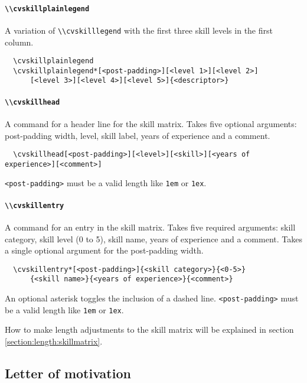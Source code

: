 \documentclass[a4paper, 11pt]{article}
\newcommand{\code}[1]{\lstinline!#1!}
\begin{document}
\paragraph{\code{\\cvskillplainlegend}}
A variation of \code{\\cvskilllegend} with the first three skill levels in the first column.
\begin{lstlisting}
  \cvskillplainlegend
  \cvskillplainlegend*[<post-padding>][<level 1>][<level 2>]
      [<level 3>][<level 4>][<level 5>]{<descriptor>}
\end{lstlisting}

\paragraph{\code{\\cvskillhead}}
A command for a header line for the skill matrix.
Takes five optional arguments: post-padding width, level, skill label, years of experience and a comment.
\begin{lstlisting}
  \cvskillhead[<post-padding>][<level>][<skill>][<years of experience>][<comment>]
\end{lstlisting}
\code{<post-padding>} must be a valid length like \code{1em} or \code{1ex}.

\paragraph{\code{\\cvskillentry}}
A command for an entry in the skill matrix.
Takes five required arguments: skill category, skill level (0 to 5), skill name, years of experience and a comment.
Takes a single optional argument for the post-padding width.
\begin{lstlisting}
  \cvskillentry*[<post-padding>]{<skill category>}{<0-5>}
      {<skill name>}{<years of experience>}{<comment>}
\end{lstlisting}
An optional asterisk toggles the inclusion of a dashed line.
\code{<post-padding>} must be a valid length like \code{1em} or \code{1ex}.

How to make length adjustments to the skill matrix will be explained in section \ref{section:length:skillmatrix}.

\subsection{Letter of motivation}
\end{document}

